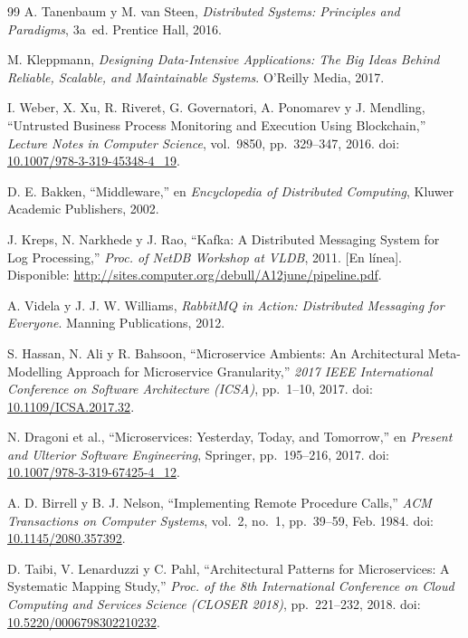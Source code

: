 \documentclass[12pt,a4paper]{article}
\begin{document}
\begin{thebibliography}{99}
A. Tanenbaum y M. van Steen,
\textit{Distributed Systems: Principles and Paradigms}, 3a~ed.
Prentice Hall, 2016.
 
M. Kleppmann,
\textit{Designing Data-Intensive Applications: The Big Ideas Behind Reliable, Scalable, and Maintainable Systems}.
O'Reilly Media, 2017.
 
I. Weber, X. Xu, R. Riveret, G. Governatori, A. Ponomarev y J. Mendling,
``Untrusted Business Process Monitoring and Execution Using Blockchain,''
\textit{Lecture Notes in Computer Science}, vol.~9850, pp.~329--347, 2016.
doi: \href{https://doi.org/10.1007/978-3-319-45348-4_19}{10.1007/978-3-319-45348-4\_19}.
 
D. E. Bakken,
``Middleware,''
en \textit{Encyclopedia of Distributed Computing},
Kluwer Academic Publishers, 2002.
 
J. Kreps, N. Narkhede y J. Rao,
``Kafka: A Distributed Messaging System for Log Processing,''
\textit{Proc. of NetDB Workshop at VLDB}, 2011.
[En línea]. Disponible: \url{http://sites.computer.org/debull/A12june/pipeline.pdf}.
 
A. Videla y J. J. W. Williams,
\textit{RabbitMQ in Action: Distributed Messaging for Everyone}.
Manning Publications, 2012.
 
S. Hassan, N. Ali y R. Bahsoon,
``Microservice Ambients: An Architectural Meta-Modelling Approach for Microservice Granularity,''
\textit{2017 IEEE International Conference on Software Architecture (ICSA)},
pp.~1--10, 2017.
doi: \href{https://doi.org/10.1109/ICSA.2017.32}{10.1109/ICSA.2017.32}.
 
N. Dragoni et al.,
``Microservices: Yesterday, Today, and Tomorrow,''
en \textit{Present and Ulterior Software Engineering},
Springer, pp.~195--216, 2017.
doi: \href{https://doi.org/10.1007/978-3-319-67425-4_12}{10.1007/978-3-319-67425-4\_12}.
 
A. D. Birrell y B. J. Nelson,
``Implementing Remote Procedure Calls,''
\textit{ACM Transactions on Computer Systems},
vol.~2, no.~1, pp.~39--59, Feb. 1984.
doi: \href{https://doi.org/10.1145/2080.357392}{10.1145/2080.357392}.
 
D. Taibi, V. Lenarduzzi y C. Pahl,
``Architectural Patterns for Microservices: A Systematic Mapping Study,''
\textit{Proc. of the 8th International Conference on Cloud Computing and Services Science (CLOSER 2018)},
pp.~221--232, 2018.
doi: \href{https://doi.org/10.5220/0006798302210232}{10.5220/0006798302210232}.
 
\end{thebibliography}
 
\end{document}
